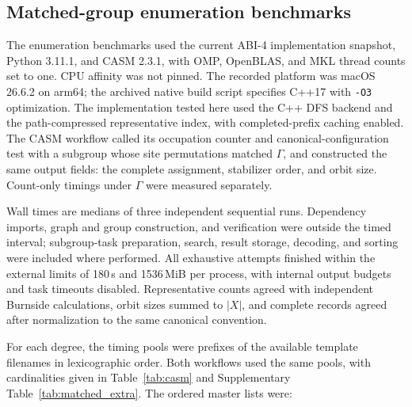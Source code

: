 \documentclass[a5paper, 10pt]{article}
\begin{document}
\begingroup\setlength{\emergencystretch}{3em}
\subsection{Matched-group enumeration benchmarks}
\label{app:enum_benchmark}

The enumeration benchmarks used the current ABI-4 implementation snapshot, Python 3.11.1, and CASM 2.3.1, with OMP, OpenBLAS, and MKL thread counts set to one. CPU affinity was not pinned. The recorded platform was macOS 26.6.2 on arm64; the archived native build script specifies C++17 with \texttt{-O3} optimization. The implementation tested here used the C++ DFS backend and the path-compressed representative index, with completed-prefix caching enabled. The CASM workflow called its occupation counter and canonical-configuration test with a subgroup whose site permutations matched $\Gamma$, and constructed the same output fields: the complete assignment, stabilizer order, and orbit size. Count-only timings under $\Gamma$ were measured separately.

Wall times are medians of three independent sequential runs. Dependency imports, graph and group construction, and verification were outside the timed interval; subgroup-task preparation, search, result storage, decoding, and sorting were included where performed. All exhaustive attempts finished within the external limits of 180\,s and 1536\,MiB per process, with internal output budgets and task timeouts disabled. Representative counts agreed with independent Burnside calculations, orbit sizes summed to $|X|$, and complete records agreed after normalization to the same canonical convention.

For each degree, the timing pools were prefixes of the available template filenames in lexicographic order. Both workflows used the same pools, with cardinalities given in Table~\ref{tab:casm} and Supplementary Table~\ref{tab:matched_extra}. The ordered master lists were:
\end{document}

